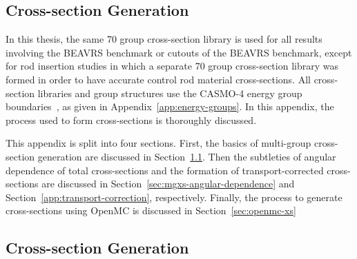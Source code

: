 \begin{appendices}
\chapter{Cross-section Generation}
\label{app:cross-section-gen}

In this thesis, the same 70 group cross-section library is used for all results involving the BEAVRS benchmark or cutouts of the BEAVRS benchmark, except for rod insertion studies in which a separate 70 group cross-section library was formed in order to have accurate control rod material cross-sections. All cross-section libraries and group structures use the CASMO-4 energy group boundaries~\cite{edenius1995casmo}, as given in Appendix~\ref{app:energy-groups}. In this appendix, the process used to form cross-sections is thoroughly discussed.

This appendix is split into four sections. First, the basics of multi-group cross-section generation are discussed in Section~\ref{sec:xs-generation}. Then the subtleties of angular dependence of total cross-sections and the formation of transport-corrected cross-sections are discussed in Section~\ref{sec:mgxs-angular-dependence} and Section~\ref{app:transport-correction}, respectively. Finally, the process to generate cross-sections using OpenMC is discussed in Section~\ref{sec:openmc-xs}


\section{Cross-section Generation}
\label{sec:xs-generation}


\end{appendices}
